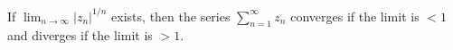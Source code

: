 If $\displaystyle \lim_{n \to \infty} |z_n|^{1/n}$ exists, then the series $\sum_{n=1}^{\infty} z_n$ converges if the limit is $< 1$ and diverges if the limit is $> 1$.
